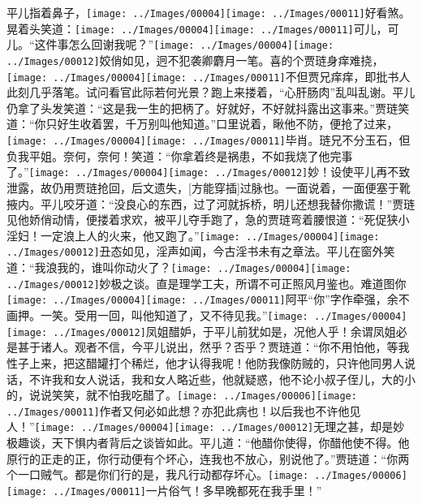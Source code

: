{平儿指着鼻子，{\texttt{[image: ../Images/00004]}\texttt{[image: ../Images/00011]}\footnotesize \kaishu 好看煞。}晃着头笑道：{\texttt{[image: ../Images/00004]}\texttt{[image: ../Images/00011]}\footnotesize \kaishu 可儿，可儿。}``这件事怎么回谢我呢？''{\texttt{[image: ../Images/00004]}\texttt{[image: ../Images/00012]}\footnotesize \kaishu 姣俏如见，迥不犯袭卿麝月一笔。}喜的个贾琏身痒难挠，{\texttt{[image: ../Images/00004]}\texttt{[image: ../Images/00011]}\footnotesize \kaishu 不但贾兄痒痒，即批书人此刻几乎落笔。试问看官此际若何光景？}跑上来搂着，``心肝肠肉''乱叫乱谢。平儿仍拿了头发笑道：``这是我一生的把柄了。好就好，不好就抖露出这事来。''贾琏笑道：``你只好生收着罢，千万别叫他知道。''口里说着，瞅他不防，便抢了过来，{\texttt{[image: ../Images/00004]}\texttt{[image: ../Images/00011]}\footnotesize \kaishu 毕肖。琏兄不分玉石，但负我平姐。奈何，奈何！}笑道：``你拿着终是祸患，不如我烧了他完事了。''{\texttt{[image: ../Images/00004]}\texttt{[image: ../Images/00012]}\footnotesize \kaishu 妙！设使平儿再不致泄露，故仍用贾琏抢回，后文遗失，{[}方能穿插{]}过脉也。}一面说着，一面便塞于靴掖内。平儿咬牙道：``没良心的东西，过了河就拆桥，明儿还想我替你撒谎！''贾琏见他娇俏动情，便搂着求欢，被平儿夺手跑了，急的贾琏弯着腰恨道：``死促狭小淫妇！一定浪上人的火来，他又跑了。''{\texttt{[image: ../Images/00004]}\texttt{[image: ../Images/00012]}\footnotesize \kaishu 丑态如见，淫声如闻，今古淫书未有之章法。}平儿在窗外笑道：``我浪我的，谁叫你动火了？{\texttt{[image: ../Images/00004]}\texttt{[image: ../Images/00012]}\footnotesize \kaishu 妙极之谈。直是理学工夫，所谓不可正照风月鉴也。}难道图你{\texttt{[image: ../Images/00004]}\texttt{[image: ../Images/00011]}\footnotesize \kaishu 阿平``你''字作牵强，余不画押。一笑。}受用一回，叫他知道了，又不待见我。''{\texttt{[image: ../Images/00004]}\texttt{[image: ../Images/00012]}\footnotesize \kaishu 凤姐醋妒，于平儿前犹如是，况他人乎！余谓凤姐必是甚于诸人。观者不信，今平儿说出，然乎？否乎？}贾琏道：``你不用怕他，等我性子上来，把这醋罐打个稀烂，他才认得我呢！他防我像防贼的，只许他同男人说话，不许我和女人说话，我和女人略近些，他就疑惑，他不论小叔子侄儿，大的小的，说说笑笑，就不怕我吃醋了。{\texttt{[image: ../Images/00006]}\texttt{[image: ../Images/00011]}\footnotesize \kaishu 作者又何必如此想？亦犯此病也！}以后我也不许他见人！''{\texttt{[image: ../Images/00004]}\texttt{[image: ../Images/00012]}\footnotesize \kaishu 无理之甚，却是妙极趣谈，天下惧内者背后之谈皆如此。}平儿道：``他醋你使得，你醋他使不得。他原行的正走的正，你行动便有个坏心，连我也不放心，别说他了。''贾琏道：``你两个一口贼气。都是你们行的是，我凡行动都存坏心。{\texttt{[image: ../Images/00006]}\texttt{[image: ../Images/00011]}\footnotesize \kaishu 一片俗气！}多早晚都死在我手里！''

}
